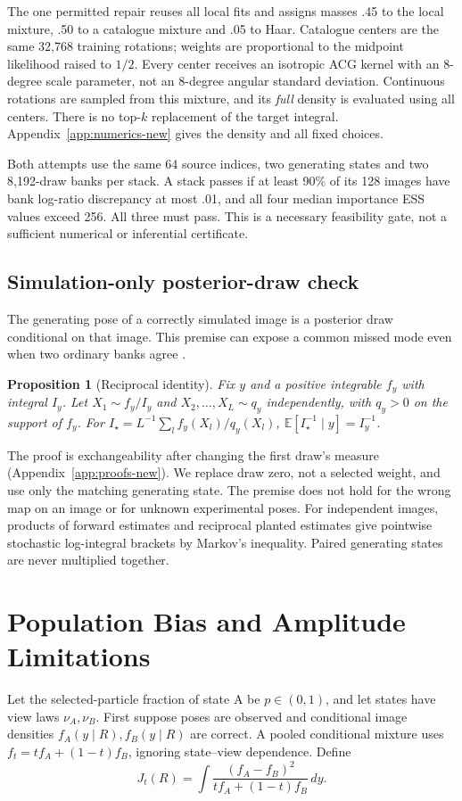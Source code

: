 \documentclass{article}
\newtheorem{proposition}{Proposition}
\newcommand{\E}{\mathbb E}
\begin{document}
The one permitted repair reuses all local fits and assigns masses .45 to
the local mixture, .50 to a catalogue mixture and .05 to Haar. Catalogue
centers are the same 32,768 training rotations; weights are proportional to
the midpoint likelihood raised to $1/2$. Every center receives an isotropic
ACG kernel with an 8-degree scale parameter, not an 8-degree angular
standard deviation. Continuous rotations are sampled from this mixture,
and its \emph{full} density is evaluated using all centers. There is no
top-$k$ replacement of the target integral. Appendix~\ref{app:numerics-new}
gives the density and all fixed choices.

Both attempts use the same 64 source indices, two generating states and
two 8,192-draw banks per stack. A stack passes if at least 90\% of its 128
images have bank log-ratio discrepancy at most .01, and all four median
importance ESS values exceed 256. All three must pass. This is a necessary
feasibility gate, not a sufficient numerical or inferential certificate.

\subsection{Simulation-only posterior-draw check}
The generating pose of a correctly simulated image is a posterior draw
conditional on that image. This premise can expose a common missed mode
even when two ordinary banks agree \citep{grosse2015}.

\begin{proposition}[Reciprocal identity]\label{prop:planted-new}
Fix $y$ and a positive integrable $f_y$ with integral $I_y$. Let
$X_1\sim f_y/I_y$ and $X_2,\ldots,X_L\sim q_y$ independently, with
$q_y>0$ on the support of $f_y$. For
$I_\star=L^{-1}\sum_l f_y(X_l)/q_y(X_l)$,
$\E[I_\star^{-1}\mid y]=I_y^{-1}$.
\end{proposition}
The proof is exchangeability after changing the first draw's measure
(Appendix~\ref{app:proofs-new}). We replace draw zero, not a selected weight,
and use only the matching generating state. The premise does not hold for
the wrong map on an image or for unknown experimental poses. For independent
images, products of forward estimates and reciprocal planted estimates
give pointwise stochastic log-integral brackets by Markov's inequality.
Paired generating states are never multiplied together.

\section{Population Bias and Amplitude Limitations}
\label{sec:population-new}
Let the selected-particle fraction of state A be $p\in(0,1)$, and let states have
view laws $\nu_A,\nu_B$. First suppose poses are observed and conditional
image densities $f_A(y\mid R),f_B(y\mid R)$ are correct. A pooled
conditional mixture uses $f_t=t f_A+(1-t)f_B$, ignoring state--view
dependence. Define
\begin{equation}\label{eq:J-new}
J_t(R)=\int\frac{(f_A-f_B)^2}{t f_A+(1-t)f_B}\,dy.
\end{equation}
\end{document}
